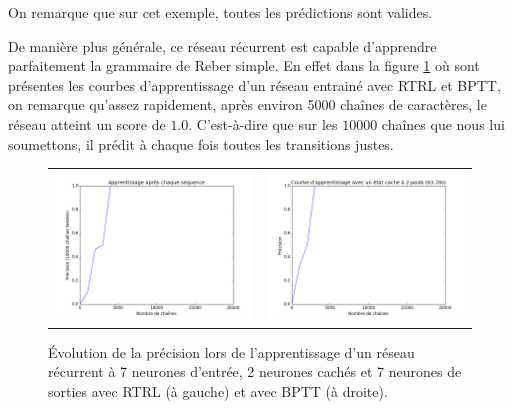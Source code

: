 On remarque que sur cet exemple, toutes les prédictions sont valides.

De manière plus générale, ce réseau récurrent est capable d'apprendre parfaitement la grammaire de Reber simple. En effet dans la figure \ref{curves_reber_simple} où sont présentes les courbes d'apprentissage d'un réseau entrainé avec RTRL et BPTT, on remarque qu'assez rapidement, après environ 5000 chaînes de caractères, le réseau atteint un score de $1.0$. C'est-à-dire que sur les $10000$ chaînes que nous lui soumettons, il prédit à chaque fois toutes les transitions justes.

\begin{figure}[h!]
\begin{center}
\begin{tabular}{cc}
\includegraphics[scale=0.3]{images/chapter5/learning_curve_rtrl_reber_sequence.png} & 
\includegraphics[scale=0.3]{images/chapter5/learning_curve_bptt_reber_sequence.png}
\end{tabular}
\caption{Évolution de la précision lors de l'apprentissage d'un réseau récurrent à 7 neurones d'entrée, 2 neurones cachés et 7 neurones de sorties avec RTRL (à gauche) et avec BPTT (à droite).}
\label{curves_reber_simple}
\end{center}
\end{figure}

